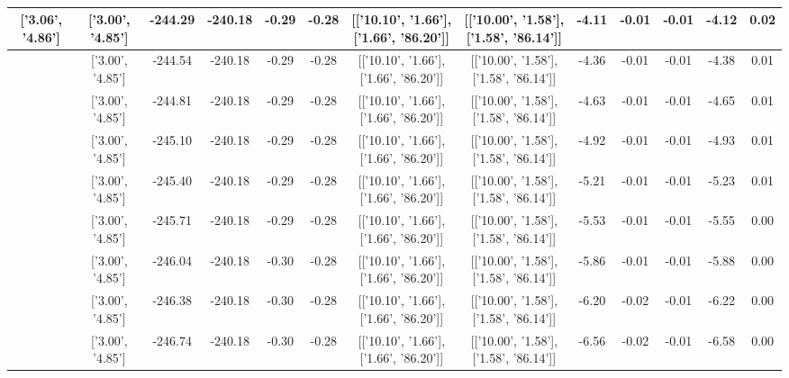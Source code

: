 \begin{table}[htbp]
\begin{adjustbox}{angle=90}
\begin{tabular}{|c|c|c|c|c|c|c|c|c|c|c|c|c|}
 ['3.06', '4.86'] & ['3.00', '4.85'] & -244.29 & -240.18 & -0.29 & -0.28 & [['10.10', '1.66'], ['1.66', '86.20']] & [['10.00', '1.58'], ['1.58', '86.14']] & -4.11 & -0.01 & -0.01 & -4.12 & 0.02\\ \hline
 ['3.07', '4.86'] & ['3.00', '4.85'] & -244.54 & -240.18 & -0.29 & -0.28 & [['10.10', '1.66'], ['1.66', '86.20']] & [['10.00', '1.58'], ['1.58', '86.14']] & -4.36 & -0.01 & -0.01 & -4.38 & 0.01\\ \hline
 ['3.07', '4.86'] & ['3.00', '4.85'] & -244.81 & -240.18 & -0.29 & -0.28 & [['10.10', '1.66'], ['1.66', '86.20']] & [['10.00', '1.58'], ['1.58', '86.14']] & -4.63 & -0.01 & -0.01 & -4.65 & 0.01\\ \hline
 ['3.07', '4.86'] & ['3.00', '4.85'] & -245.10 & -240.18 & -0.29 & -0.28 & [['10.10', '1.66'], ['1.66', '86.20']] & [['10.00', '1.58'], ['1.58', '86.14']] & -4.92 & -0.01 & -0.01 & -4.93 & 0.01\\ \hline
 ['3.08', '4.86'] & ['3.00', '4.85'] & -245.40 & -240.18 & -0.29 & -0.28 & [['10.10', '1.66'], ['1.66', '86.20']] & [['10.00', '1.58'], ['1.58', '86.14']] & -5.21 & -0.01 & -0.01 & -5.23 & 0.01\\ \hline
 ['3.08', '4.86'] & ['3.00', '4.85'] & -245.71 & -240.18 & -0.29 & -0.28 & [['10.10', '1.66'], ['1.66', '86.20']] & [['10.00', '1.58'], ['1.58', '86.14']] & -5.53 & -0.01 & -0.01 & -5.55 & 0.00\\ \hline
 ['3.09', '4.86'] & ['3.00', '4.85'] & -246.04 & -240.18 & -0.30 & -0.28 & [['10.10', '1.66'], ['1.66', '86.20']] & [['10.00', '1.58'], ['1.58', '86.14']] & -5.86 & -0.01 & -0.01 & -5.88 & 0.00\\ \hline
 ['3.09', '4.86'] & ['3.00', '4.85'] & -246.38 & -240.18 & -0.30 & -0.28 & [['10.10', '1.66'], ['1.66', '86.20']] & [['10.00', '1.58'], ['1.58', '86.14']] & -6.20 & -0.02 & -0.01 & -6.22 & 0.00\\ \hline
 ['3.09', '4.86'] & ['3.00', '4.85'] & -246.74 & -240.18 & -0.30 & -0.28 & [['10.10', '1.66'], ['1.66', '86.20']] & [['10.00', '1.58'], ['1.58', '86.14']] & -6.56 & -0.02 & -0.01 & -6.58 & 0.00\\ \hline
            \end{tabular}
        \end{adjustbox}
        \caption{}
        \label{}
    \end{table}
    